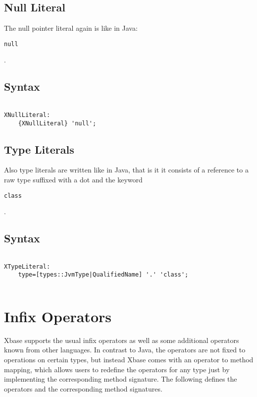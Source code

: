 \documentclass[a4paper,10pt]{scrreprt}
\begin{document}
\subsection{ Null Literal }
\label{NullLiteral}

The null pointer literal again is like in Java: 
\begin{lstlisting}
null
\end{lstlisting}
. 




\subsection{ Syntax }


\begin{lstlisting}

XNullLiteral:
	{XNullLiteral} 'null';

\end{lstlisting}





\subsection{ Type Literals }
\label{TypeLiteral}

Also type literals are written like in Java, that is it it consists of a reference to a raw type suffixed with a dot and the keyword 
\begin{lstlisting}
class
\end{lstlisting}
.




\subsection{ Syntax }


\begin{lstlisting}

XTypeLiteral:
	type=[types::JvmType|QualifiedName] '.' 'class';
 
\end{lstlisting}







\section{Infix Operators}
\label{Operators}

Xbase supports the usual infix operators as well as some additional operators known from other languages. In contrast to Java, the operators are not fixed
to operations on certain types, but instead Xbase comes with an operator to method mapping, which allows users to redefine the operators for any type just by implementing
the corresponding method signature. The following defines the operators and the corresponding method signatures.
\end{document}
